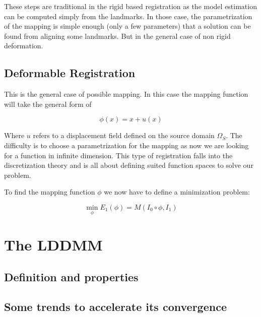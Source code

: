 These steps are traditional in the rigid based registration as the model estimation can be computed simply from the landmarks. In those case, the parametrization of the mapping is simple enough (only a few parameters) that a solution can be found from aligning some landmarks. But in the general case of non rigid deformation. 


\subsection{Deformable Registration}

This is the general case of possible mapping. In this case the mapping function will take the general form of

\begin{equation}
    \phi(x) = x + u(x)
\end{equation}

Where $u$ refers to a displacement field defined on the source domain $\Omega_S$.  The difficulty is to choose a parametrization for the mapping as now we are looking for a function in infinite dimension. This type of registration falls into the discretization theory and is all about defining suited function spaces to solve our problem. 

To find the mapping function $\phi$ we now have to define a minimization problem:

\begin{equation}
    \min_\phi E_1(\phi) = M(I_0 \circ \phi, I_1)
\end{equation}

\section{The LDDMM}

\subsection{Definition and properties}

\subsection{Some trends to accelerate its convergence}


